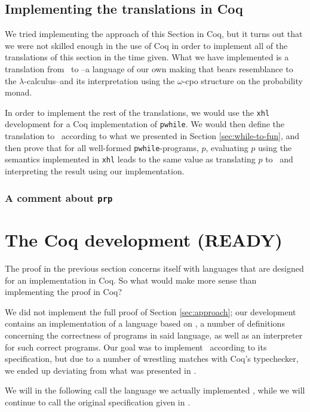 \documentclass[11pt, leqno, titlepage]{article}
\theoremstyle{definition}
\begin{document}
\subsection{Implementing the translations in Coq}
\label{sec:howto-coq}
We tried implementing the approach of this Section in Coq, but it turns out that we
were not skilled enough in the use of Coq in order to implement all of the
translations of this section in the time given. What we have implemented is a
translation from \rml\ to \srml --a language of our own making that bears resemblance
to the $\lambda$-calculus--and its interpretation using the $\omega$-cpo structure on
the probability monad. 

In order to implement the rest of the translations, we would use the \texttt{xhl}
development for a Coq implementation of \texttt{pwhile}. We would then define the
translation to \rml\ according to what we presented in Section
\ref{sec:while-to-fun}, and then prove that for all well-formed
\texttt{pwhile}-programs, $p$, evaluating $p$ using the semantics implemented in
\texttt{xhl} leads to the same value as translating $p$ to \rml\ and interpreting the
result using our implementation. 

\subsubsection{A comment about \texttt{prp}}


\section{The Coq development (READY)}\label{sec:contrib}
The proof in the previous section concerns itself with languages that are designed
for an implementation in Coq. So what would make more sense than implementing the
proof in Coq?

We did not implement the full proof of Section \ref{sec:approach}; our development
contains an implementation of a language based on \rml, a number of definitions
concerning the correctness of programs in said language, as well as an interpreter
for such correct programs. Our goal was to implement \rml\ according to its
specification, but due to a number of wrestling matches with Coq's typechecker, we
ended up deviating from what was presented in \cite{rml-paper}.

We will in the following call the language we actually implemented \rmlx, while we
will continue to call the original specification given in \cite{rml-paper} \rml. 
\end{document}
